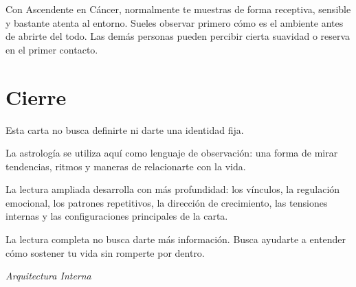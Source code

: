 \documentclass[11pt,a4paper]{article}
\begin{document}
Con Ascendente en Cáncer, normalmente te muestras de forma receptiva, sensible y bastante atenta al entorno. Sueles observar primero cómo es el ambiente antes de abrirte del todo. Las demás personas pueden percibir cierta suavidad o reserva en el primer contacto.

\vspace{0.8cm}


\section{Cierre}

Esta carta no busca definirte ni darte una identidad fija.

La astrología se utiliza aquí como lenguaje de observación:
una forma de mirar tendencias, ritmos y maneras de relacionarte con la vida.

La lectura ampliada desarrolla con más profundidad:
los vínculos,
la regulación emocional,
los patrones repetitivos,
la dirección de crecimiento,
las tensiones internas
y las configuraciones principales de la carta.

La lectura completa no busca darte más información.
Busca ayudarte a entender cómo sostener tu vida sin romperte por dentro.

\vspace{1cm}

\begin{center}

{\small\itshape\color{grisai}
Arquitectura Interna
}

\end{center}
\end{document}
